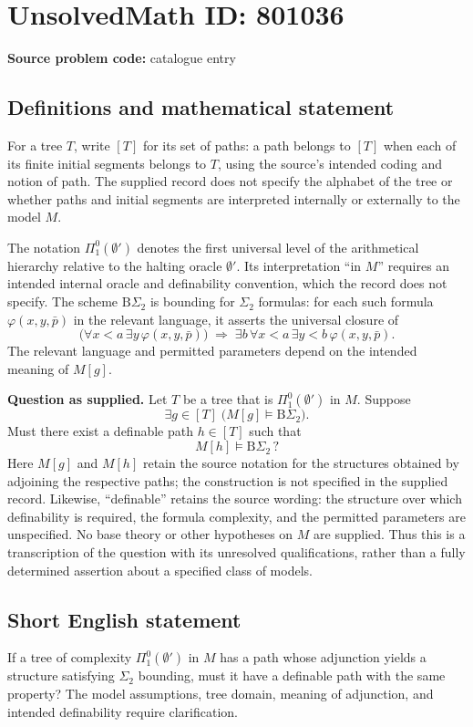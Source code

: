 \documentclass[11pt]{article}
\begin{document}
\section*{UnsolvedMath ID: 801036}
\textbf{Source problem code:} catalogue entry
\subsection{Definitions and mathematical statement}
For a tree \(T\), write \([T]\) for its set of paths: a path belongs to \([T]\) when each of its finite initial segments belongs to \(T\), using the source's intended coding and notion of path. The supplied record does not specify the alphabet of the tree or whether paths and initial segments are interpreted internally or externally to the model \(M\).

The notation \(\Pi^0_1(\emptyset')\) denotes the first universal level of the arithmetical hierarchy relative to the halting oracle \(\emptyset'\). Its interpretation ``in \(M\)'' requires an intended internal oracle and definability convention, which the record does not specify. The scheme \(\mathrm{B}\Sigma_2\) is bounding for \(\Sigma_2\) formulas: for each such formula \(\varphi(x,y,\bar p)\) in the relevant language, it asserts the universal closure of
\[
\bigl(\forall x<a\,\exists y\,\varphi(x,y,\bar p)\bigr)
\;\Longrightarrow\;
\exists b\,\forall x<a\,\exists y<b\,\varphi(x,y,\bar p).
\]
The relevant language and permitted parameters depend on the intended meaning of \(M[g]\).

\textbf{Question as supplied.} Let \(T\) be a tree that is \(\Pi^0_1(\emptyset')\) in \(M\). Suppose
\[
\exists g\in[T]\;\bigl(M[g]\models\mathrm{B}\Sigma_2\bigr).
\]
Must there exist a definable path \(h\in[T]\) such that
\[
M[h]\models\mathrm{B}\Sigma_2\,?
\]
Here \(M[g]\) and \(M[h]\) retain the source notation for the structures obtained by adjoining the respective paths; the construction is not specified in the supplied record. Likewise, ``definable'' retains the source wording: the structure over which definability is required, the formula complexity, and the permitted parameters are unspecified. No base theory or other hypotheses on \(M\) are supplied. Thus this is a transcription of the question with its unresolved qualifications, rather than a fully determined assertion about a specified class of models.
\subsection{Short English statement}
If a tree of complexity \(\Pi^0_1(\emptyset')\) in \(M\) has a path whose adjunction yields a structure satisfying \(\Sigma_2\) bounding, must it have a definable path with the same property? The model assumptions, tree domain, meaning of adjunction, and intended definability require clarification.
\end{document}

